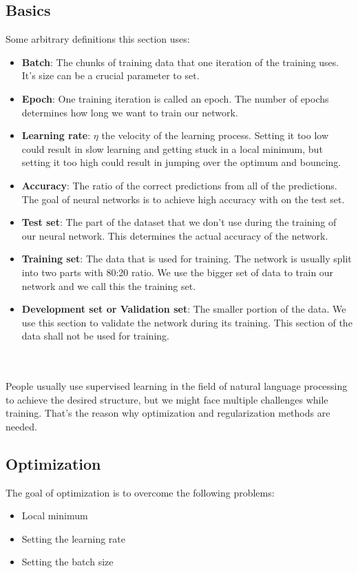 \subsection{Basics}
\begin{minipage}{\textwidth}
	Some arbitrary definitions this section uses:
	\begin{itemize}
		\item \textbf{Batch}: The chunks of training data that one iteration of the training uses. It's size can be a crucial parameter to set.
		\item \textbf{Epoch}: One training iteration is called an epoch. The number of epochs determines how long we want to train our network.
		\item \textbf{Learning rate}: \(\eta\) the velocity of the learning process. Setting it too low could result in slow learning and getting stuck in a local minimum, but setting it too high could result in jumping over the optimum and bouncing.
		\item \textbf{Accuracy}: The ratio of the correct predictions from all of the predictions. The goal of neural networks is to achieve high accuracy with on the test set.
		\item \textbf{Test set}: The part of the dataset that we don't use during the training of our neural network. This determines the actual accuracy of the network.
		\item \textbf{Training set}: The data that is used for training. The network is usually split into two parts with 80:20 ratio. We use the bigger set of data to train our network and we call this the training set.
		\item \textbf{Development set or Validation set}: The smaller portion of the data. We use this section to validate the network during its training. This section of the data shall not be used for training.
	\end{itemize}
\end{minipage}
\\
\\
People usually use supervised learning in the field of natural language processing to achieve the desired structure, but we might face multiple challenges while training. That's the reason why  optimization and regularization methods are needed.

\subsection{Optimization}
The goal of optimization is to overcome the following problems:
\begin{itemize}
	\item Local minimum
	\item Setting the learning rate
	\item Setting the batch size
\end{itemize}

